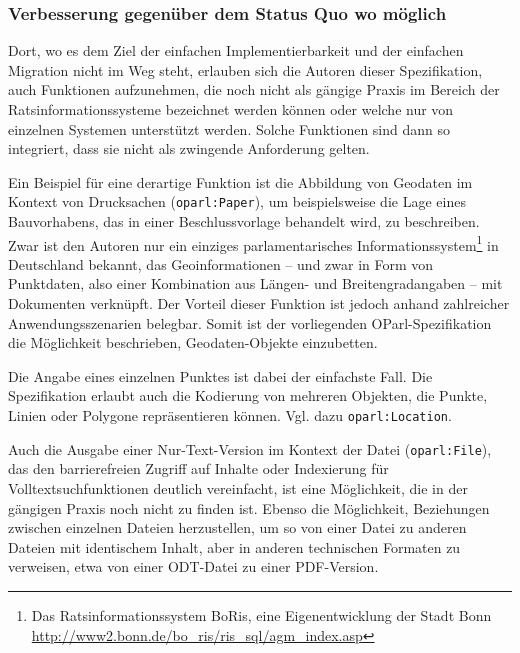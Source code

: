 \documentclass[,a4paper]{article}
\begin{document}
\subsubsection{Verbesserung gegenüber dem Status Quo wo
möglich}\label{verbesserung-gegenuxfcber-dem-status-quo-wo-muxf6glich}

Dort, wo es dem Ziel der einfachen Implementierbarkeit und der einfachen
Migration nicht im Weg steht, erlauben sich die Autoren dieser
Spezifikation, auch Funktionen aufzunehmen, die noch nicht als gängige
Praxis im Bereich der Ratsinformationssysteme bezeichnet werden können
oder welche nur von einzelnen Systemen unterstützt werden. Solche
Funktionen sind dann so integriert, dass sie nicht als zwingende
Anforderung gelten.

Ein Beispiel für eine derartige Funktion ist die Abbildung von Geodaten
im Kontext von Drucksachen (\texttt{oparl:Paper}), um beispielsweise die
Lage eines Bauvorhabens, das in einer Beschlussvorlage behandelt wird,
zu beschreiben. Zwar ist den Autoren nur ein einziges parlamentarisches
Informationssystem\footnote{Das Ratsinformationssystem BoRis, eine
  Eigenentwicklung der Stadt Bonn
  \url{http://www2.bonn.de/bo_ris/ris_sql/agm_index.asp}} in Deutschland
bekannt, das Geoinformationen -- und zwar in Form von Punktdaten, also
einer Kombination aus Längen- und Breitengradangaben -- mit Dokumenten
verknüpft. Der Vorteil dieser Funktion ist jedoch anhand zahlreicher
Anwendungsszenarien belegbar. Somit ist der vorliegenden
OParl-Spezifikation die Möglichkeit beschrieben, Geodaten-Objekte
einzubetten.

Die Angabe eines einzelnen Punktes ist dabei der einfachste Fall. Die
Spezifikation erlaubt auch die Kodierung von mehreren Objekten, die
Punkte, Linien oder Polygone repräsentieren können. Vgl. dazu
\texttt{oparl:Location}.

Auch die Ausgabe einer Nur-Text-Version im Kontext der Datei
(\texttt{oparl:File}), das den barrierefreien Zugriff auf Inhalte oder
Indexierung für Volltextsuchfunktionen deutlich vereinfacht, ist eine
Möglichkeit, die in der gängigen Praxis noch nicht zu finden ist. Ebenso
die Möglichkeit, Beziehungen zwischen einzelnen Dateien herzustellen, um
so von einer Datei zu anderen Dateien mit identischem Inhalt, aber in
anderen technischen Formaten zu verweisen, etwa von einer ODT-Datei zu
einer PDF-Version.

\end{document}
